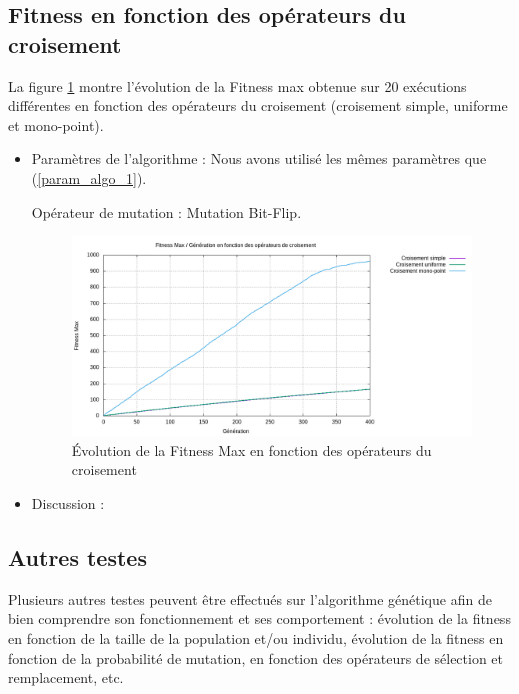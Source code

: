 \documentclass[12pt]{article}
\begin{document}
\subsection{Fitness en fonction des opérateurs du croisement } La figure \ref{fitness_op_crois} montre l'évolution de la Fitness max obtenue sur 20 exécutions différentes en fonction des opérateurs du croisement (croisement simple, uniforme et mono-point).
\begin{itemize}
\item{Paramètres de l'algorithme : }  Nous avons utilisé les mêmes paramètres que (\ref{param_algo_1}). 
	\begin{itemize}
	Opérateur de mutation : Mutation Bit-Flip.
	\end{itemize}  
 
\begin{figure}[H]
		\begin{center}
			\includegraphics[scale=0.5]{img/fitness_op_crois.png}
			\caption{Évolution de la Fitness Max en fonction des opérateurs du croisement}
			\label{fitness_op_crois}
		\end{center}
\end{figure} 

\item{Discussion :}
\end{itemize}

\subsection{Autres testes}
Plusieurs autres testes peuvent être effectués sur l'algorithme génétique afin de bien comprendre son fonctionnement et ses comportement : évolution de la fitness en fonction de la taille de la population et/ou individu, évolution de la fitness en fonction de la probabilité de mutation, en fonction des opérateurs de sélection et remplacement, etc.\\
\end{document}
